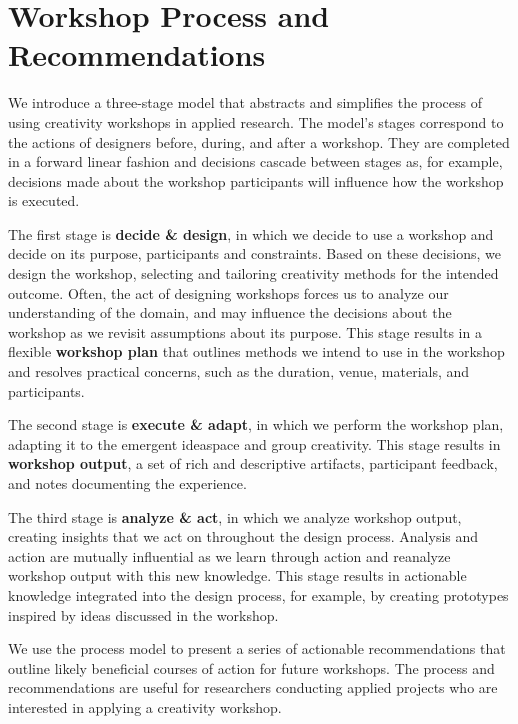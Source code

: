 \section{Workshop Process and Recommendations}
\label{sec:process}

We introduce a three-stage model that abstracts and simplifies the process of using creativity workshops in applied research. The model's stages correspond to the actions of designers before, during, and after a workshop. They are completed in a forward linear fashion and decisions cascade between stages as, for example, decisions made about the workshop participants will influence how the workshop is executed. 

The first stage is {\bf decide \& design}, in which we decide to use a workshop and decide on its purpose, participants and constraints. Based on these decisions, we design the workshop, selecting and tailoring creativity methods for the intended outcome. Often, the act of designing workshops forces us to analyze our understanding of the domain, and may influence the decisions about the workshop as we revisit assumptions about its purpose. This stage results in a flexible {\bf workshop plan} that outlines methods we intend to use in the workshop and resolves practical concerns, such as the duration, venue, materials, and participants.

The second stage is {\bf execute \& adapt}, in which we perform the workshop plan, adapting it to the emergent ideaspace and group creativity. This stage results in {\bf workshop output}, a set of rich and descriptive artifacts, participant feedback, and notes documenting the experience.

The third stage is {\bf analyze \& act}, in which we analyze workshop output, creating insights that we act on throughout the design process. Analysis and action are mutually influential as we learn through action and reanalyze workshop output with this new knowledge. This stage results in actionable knowledge integrated into the design process, for example, by creating prototypes inspired by ideas discussed in the workshop.

We use the process model to present a series of  actionable recommendations that outline likely beneficial courses of action for future workshops. The process and recommendations are useful for researchers conducting applied projects who are interested in applying a creativity workshop.



